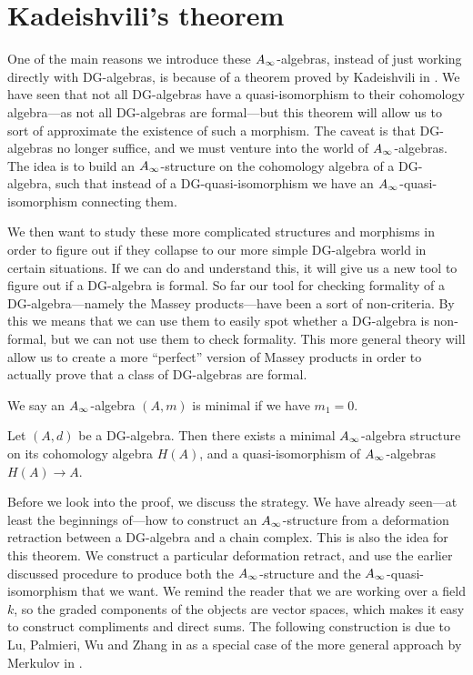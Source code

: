 

\section{Kadeishvili's theorem}

One of the main reasons we introduce these $A_{\infty}$-algebras, instead of just working directly with DG-algebras, is because of a theorem proved by Kadeishvili in \cite{kadeishvili}. We have seen that not all DG-algebras have a quasi-isomorphism to their cohomology algebra---as not all DG-algebras are formal---but this theorem will allow us to sort of approximate the existence of such a morphism. The caveat is that DG-algebras no longer suffice, and we must venture into the world of $A_{\infty}$-algebras. The idea is to build an $A_{\infty}$-structure on the cohomology algebra of a DG-algebra, such that instead of a DG-quasi-isomorphism we have an $A_{\infty}$-quasi-isomorphism connecting them. 

We then want to study these more complicated structures and morphisms in order to figure out if they collapse to our more simple DG-algebra world in certain situations. If we can do and understand this, it will give us a new tool to figure out if a DG-algebra is formal. So far our tool for checking formality of a DG-algebra---namely the Massey products---have been a sort of non-criteria. By this we means that we can use them to easily spot whether a DG-algebra is non-formal, but we can not use them to check formality. This more general theory will allow us to create a more ``perfect'' version of Massey products in order to actually prove that a class of DG-algebras are formal. 

\begin{definition}
We say an $A_{\infty}$-algebra $(A, m)$ is minimal if we have $m_1 = 0$. 
\end{definition}

\begin{theorem}
Let $(A,d)$ be a DG-algebra. Then there exists a minimal $A_{\infty}$-algebra structure on its cohomology algebra $H(A)$, and a quasi-isomorphism of $A_{\infty}$-algebras $H(A)\rightarrow A$. 
\end{theorem}

Before we look into the proof, we discuss the strategy. We have already seen---at least the beginnings of---how to construct an $A_{\infty}$-structure from a deformation retraction between a DG-algebra and a chain complex. This is also the idea for this theorem. We construct a particular deformation retract, and use the earlier discussed procedure to produce both the $A_{\infty}$-structure and the $A_{\infty}$-quasi-isomorphism that we want. We remind the reader that we are working over a field $k$, so the graded components of the objects are vector spaces, which makes it easy to construct compliments and direct sums. The following construction is due to Lu, Palmieri, Wu and Zhang in \cite{Ext} as a special case of the more general approach by Merkulov in \cite{Merkulov}. 

